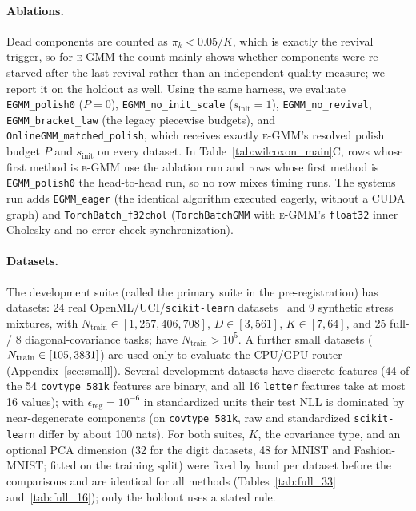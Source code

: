 \documentclass[10pt]{article} %
\newcommand{\egmm}{\textsc{e-GMM}}
\begin{document}
\paragraph{Ablations.} Dead components are counted as $\pi_k < 0.05/K$, which is exactly the revival trigger, so for \egmm{} the count mainly shows whether components were re-starved after the last revival rather than an independent quality measure; we report it on the holdout as well. Using the same harness, we evaluate \texttt{EGMM\_polish0} ($P = 0$), \texttt{EGMM\_no\_init\_scale} ($s_{\mathrm{init}} = 1$), \texttt{EGMM\_no\_revival}, \texttt{EGMM\_bracket\_law} (the legacy piecewise budgets), and \texttt{OnlineGMM\_matched\_polish}, which receives exactly \egmm{}'s resolved polish budget $P$ and $s_{\mathrm{init}}$ on every dataset. In Table~\ref{tab:wilcoxon_main}C, rows whose first method is \egmm{} use the ablation run and rows whose first method is \texttt{EGMM\_polish0} the head-to-head run, so no row mixes timing runs. The systems run adds \texttt{EGMM\_eager} (the identical algorithm executed eagerly, without a CUDA graph) and \texttt{TorchBatch\_f32chol} (\texttt{TorchBatchGMM} with \egmm{}'s \texttt{float32} inner Cholesky and no error-check synchronization).

\paragraph{Datasets.} The development suite (called the primary suite in the pre-registration) has \rnDatasets{} datasets: 24 real OpenML/UCI/\texttt{scikit-learn} datasets~\citep{blackard1999covertype,lecun1998mnist,xiao2017fashion,roe2005miniboone} and 9 synthetic stress mixtures, with $N_{\mathrm{train}} \in [1{,}257, 406{,}708]$, $D \in [3, 561]$, $K \in [7, 64]$, and 25 full- / 8 diagonal-covariance tasks; \rnLarge{} have $N_{\mathrm{train}} > 10^5$. A further \rnSmall{} small datasets ($N_{\mathrm{train}} \in [105, 3831]$) are used only to evaluate the CPU/GPU router (Appendix~\ref{sec:small}). Several development datasets have discrete features (44 of the 54 \texttt{covtype\_581k} features are binary, and all 16 \texttt{letter} features take at most 16 values); with $\epsilon_{\mathrm{reg}} = 10^{-6}$ in standardized units their test NLL is dominated by near-degenerate components (on \texttt{covtype\_581k}, raw and standardized \texttt{scikit-learn} differ by about 100 nats). For both suites, $K$, the covariance type, and an optional PCA dimension (32 for the digit datasets, 48 for MNIST and Fashion-MNIST; fitted on the training split) were fixed by hand per dataset before the comparisons and are identical for all methods (Tables~\ref{tab:full_33} and~\ref{tab:full_16}); only the holdout uses a stated rule.
\end{document}
